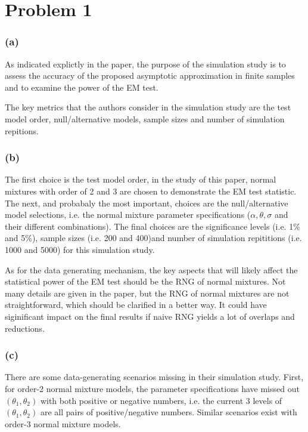\documentclass{article}
\begin{document}
\section*{Problem 1}

\subsubsection*{(a)}

\hspace{12 pt} As indicated explictly in the paper, the purpose of the simulation study is to assess the accuracy
of the proposed asymptotic approximation in finite samples and to examine the power of the EM test. 

The key metrics that the authors consider in the simulation study are the test model order, null/alternative 
models, sample sizes and number of simulation repitions.

\subsubsection*{(b)}

\hspace{12 pt} The first choice is the test model order, in the study of this paper, normal mixtures with order of 2 and 3 are
chosen to demonstrate the EM test statistic.
The next, and probabaly the most important, choices are the null/alternative model selections, i.e. the normal mixture parameter 
specifications ($\alpha, \theta, \sigma$ and their different combinations). 
The final choices are the significance levels (i.e. 1\% and 5\%), 
sample sizes (i.e. 200 and 400)and number of simulation repititions (i.e. 1000 and 5000) for this simulation study.

As for the data generating mechanism, the key aspects that will likely affect the statistical power of the EM test
should be the RNG of normal mixtures. Not many details are given in the paper, but the RNG of normal mixtures 
are not straightforward, which should be clarified in a better way. It could have siginificant impact on the final results if naive
RNG yields a lot of overlaps and reductions.

\subsubsection*{(c)}

\hspace{12 pt} There are some data-generating scenarios missing in their simulation study.
First, for order-2 normal mixture models, the parameter specifications have missed out $(\theta_1,\theta_2)$ with
both positive or negative numbers, i.e. the current 3 levels of $(\theta_1,\theta_2)$ are all pairs of positive/negative numbers.
Similar scenarios exist with order-3 normal mixture models.
\end{document}
